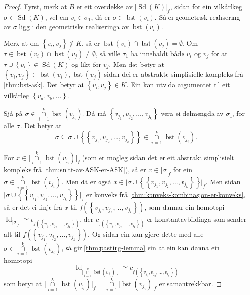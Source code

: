\documentclass[a4paper, 12pt, norsk]{article}
\theoremstyle{plain}
\theoremstyle{definition}
\newcommand{\intersect}{ \mathop{\cap}\limits }
\newcommand{\union}{ \mathop{\cup}\limits }
\newcommand{\gr}[1]{ \lvert #1 \rvert } %
\newcommand{\set}[1]{ \left\{ #1 \right\} } %
\DeclareMathOperator{\Sd}{Sd} %
\DeclareMathOperator{\bst}{bst} %
\DeclareMathOperator{\Id}{Id} %
\begin{document}
\begin{proof} %
	Fyrst, merk at \( B \) er eit overdekke av \( \gr{\Sd(K)}_f \), sidan for ein vilkårlkeg \( \sigma \in \Sd(K) \), vel ein \( v_i \in \sigma_1 \), då er \( \sigma \in \bst(v_i) \). Så ei geometrisk realisering av \( \sigma \) ligg i den geometriske realiseringa av \( \bst(v_i) \).

	Merk at om \( \set{v_i, v_j} \not\in K \), så er \( \bst(v_i) \intersect \bst(v_j) = \emptyset \). Om \( \tau \in \bst(v_i) \intersect \bst(v_j) \neq \emptyset \), så ville \( \tau_1 \) ha innehaldt både \( v_i \) og \( v_j \) for at \( \tau \union \set{v_i} \in \Sd(K) \) og likt for \( v_j \). Men det betyr at \( \set{v_i, v_j} \in \bst(v_i), \bst(v_j) \) sidan dei er abstrakte simplisielle kompleks frå \autoref{thm:bst-ask}. Det betyr at \( \set{v_i, v_j} \in K \). Ein kan utvida argumentet til eit vilkårleg \( \set{v_a, v_b, \dots} \).

	Sjå på \( \sigma \in \intersect_{i = 1}^k \bst(v_{j_i}) \). Då må \( \set{v_{j_1}, v_{j_2}, \dots, v_{j_k}} \) vera ei delmengda av \( \sigma_1 \), for alle \( \sigma \). Det betyr at 
	\[ 
		\sigma \subseteq \sigma \union \set{\set{v_{j_1}, v_{j_2}, \dots, v_{j_k}}} \in \intersect_{i = 1}^k \bst(v_{j_i}).
	\]

	For \(x \in \gr{\intersect_{i = 1}^k \bst(v_{j_i})}_f \) (som er mogleg sidan det er eit abstrakt simplisielt kompleks frå \autoref{thm:snitt-av-ASK-er-ASK}), så er \( x \in \gr{\sigma}_f \) for ein \( \sigma \in \intersect_{i = 1}^k \bst(v_{j_i}) \). Men då er også \( x \in \gr{\sigma \union \set{\set{v_{j_1}, v_{j_2}, \dots, v_{j_k}}}}_f \). Men sidan \( \gr{\sigma \union \set{\set{v_{j_1}, v_{j_2}, \dots, v_{j_k}}}}_f \) er konveks frå \autoref{thm:konveks-kombinasjon-er-konveks}, så er det ei linje frå \( x \) til \( f(\set{v_{j_1}, v_{j_2}, \dots, v_{j_k}}) \), som dannar ein homotopi \( \Id_{\gr{\sigma}_f} \simeq c_{f(\set{v_{j_1}, v_{j_2}, \dots, v_{j_k}})} \), der \( c_{f(\set{v_{j_1}, v_{j_2}, \dots, v_{j_k}})} \) er konstantavbildinga som sender alt til \( f(\set{v_{j_1}, v_{j_2}, \dots, v_{j_k}}) \). Og sidan ein kan gjere dette med alle \( \sigma \in \intersect_{i = 1}^k \bst(v_{j_i}) \), så gir \autoref{thm:pasting-lemma} ein at ein kan danna ein homotopi
	\[ 
		\Id_{\gr{\intersect_{i = 1}^k \bst(v_{j_i})}_f} \simeq c_{f(\set{v_{j_1}, v_{j_2}, \dots, v_{j_k}})}
	\]
	som betyr at \( \gr{\intersect_{i = 1}^k \bst(v_{j_i})}_f = \intersect_{i = 1}^k \gr{\bst(v_{j_i})}_f\) er samantrekkbar.
\end{proof}
\end{document}
